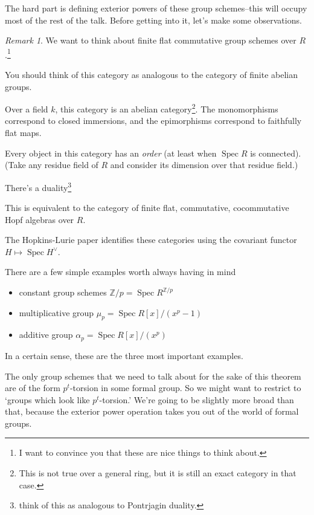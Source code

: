 \documentclass{article}
\newcommand{\Z}{{\mathbb{Z}}}
\DeclareMathOperator{\Spec}{Spec}
\theoremstyle{definition} \newtheorem*{defn}{Definition}
\theoremstyle{plain} \newtheorem*{prop}{Proposition}
\theoremstyle{plain} \newtheorem*{lemma}{Lemma}
\theoremstyle{plain} \newtheorem*{cor}{Corollary}
\theoremstyle{remark} \newtheorem*{ex}{Example}
\theoremstyle{remark} \newtheorem*{exs}{Examples}
\theoremstyle{remark} \newtheorem*{nonex}{Non-example}
\theoremstyle{remark} \newtheorem*{rmk}{Remark}
\theoremstyle{remark} \newtheorem*{exc}{Exercise}
\theoremstyle{remark} \newtheorem*{idea}{Idea}
\theoremstyle{remark} \newtheorem*{obs}{Observation}
\theoremstyle{plain} \newtheorem*{theorem}{Theorem}
\theoremstyle{plain} \newtheorem*{conj}{Conjecture}
\theoremstyle{remark} \newtheorem*{q}{Question}
\theoremstyle{definition} \newtheorem*{fact}{Fact}
\theoremstyle{definition} \newtheorem*{facts}{Facts}
\theoremstyle{remark} \newtheorem*{ntn}{Notation}
\theoremstyle{remark} \newtheorem*{goal}{Goal}
\theoremstyle{remark} \newtheorem*{sketch}{Sketch}
\theoremstyle{definition} \newtheorem{claim}{Claim}
\begin{document}
The hard part is defining exterior powers of these group schemes--this will occupy most of the rest of the talk. 
Before getting into it, let's make some observations. 
\begin{rmk}
	We want to think about finite flat commutative group schemes over $ R $.\footnote{I want to convince you that these are nice things to think about.} 

	You should think of this category as analogous to the category of finite abelian groups. 

	Over a field $ k $, this category is an abelian category\footnote{This is not true over a general ring, but it is still an exact category in that case.}. 
	The monomorphisms correspond to closed immersions, and the epimorphisms correspond to faithfully flat maps. 

	Every object in this category has an \emph{order} (at least when $ \Spec R $ is connected). 
	(Take any residue field of $ R $ and consider its dimension over that residue field.) 

	There's a duality\footnote{think of this as analogous to Pontrjagin duality. }

	This is equivalent to the category of finite flat, commutative, cocommutative Hopf algebras over $ R $. 
\end{rmk}

The Hopkins-Lurie paper identifies these categories using the covariant functor $ H \mapsto \Spec H^\vee $. 

There are a few simple examples worth always having in mind
\begin{itemize}
	\item constant group schemes $ \Z/p = \Spec R^{\Z/p} $
	\item multiplicative group $ \mu_p = \Spec R[x]/(x^p - 1) $
	\item additive group $ \alpha_p = \Spec R[x]/(x^p ) $
\end{itemize}
In a certain sense, these are the three most important examples. 

The only group schemes that we need to talk about for the sake of this theorem are of the form $ p^t $-torsion in some formal group. 
So we might want to restrict to `groups which look like $ p^t $-torsion.' 
We're going to be slightly more broad than that, because the exterior power operation takes you out of the world of formal groups. 
\end{document}
